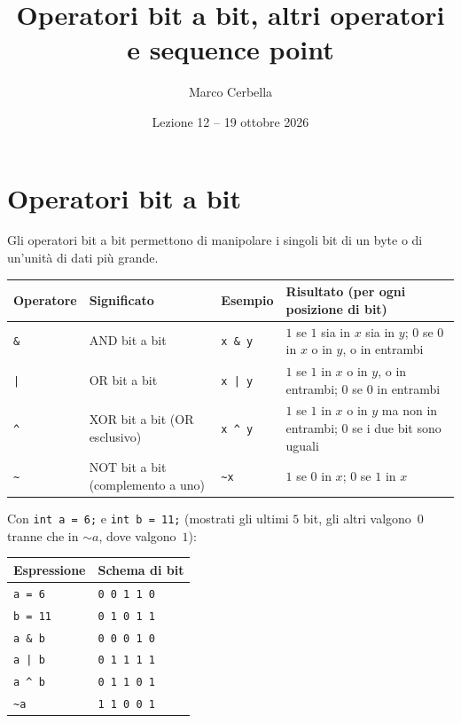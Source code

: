 \documentclass[11pt,a4paper]{article}
\title{Operatori bit a bit, altri operatori e sequence point}
\author{Marco Cerbella}
\date{Lezione 12 -- 19 ottobre 2026}
\begin{document}
\maketitle

\section{Operatori bit a bit}

Gli operatori bit a bit permettono di manipolare i singoli bit di un byte o di un'unità di dati più grande.

\begin{center}
\begin{tabular}{l p{3.2cm} l p{5.6cm}}
\toprule
Operatore & Significato & Esempio & Risultato (per ogni posizione di bit)\\
\midrule
\lstinline|&| & AND bit a bit & \lstinline|x & y| & $1$ se $1$ sia in $x$ sia in $y$; $0$ se $0$ in $x$ o in $y$, o in entrambi\\
\lstinline/|/ & OR bit a bit & \lstinline/x | y/ & $1$ se $1$ in $x$ o in $y$, o in entrambi; $0$ se $0$ in entrambi\\
\lstinline|^| & XOR bit a bit (OR esclusivo) & \lstinline|x ^ y| & $1$ se $1$ in $x$ o in $y$ ma non in entrambi; $0$ se i due bit sono uguali\\
\lstinline|~| & NOT bit a bit (complemento a uno) & \lstinline|~x| & $1$ se $0$ in $x$; $0$ se $1$ in $x$\\
\bottomrule
\end{tabular}
\end{center}

\begin{esempio}
Con \lstinline|int a = 6;| e \lstinline|int b = 11;| (mostrati gli ultimi $5$ bit, gli altri valgono~$0$ tranne che in $\sim a$, dove valgono~$1$):
\begin{center}
\begin{tabular}{ll}
\toprule
Espressione & Schema di bit\\
\midrule
\lstinline|a = 6|  & \texttt{0\,0\,1\,1\,0}\\
\lstinline|b = 11| & \texttt{0\,1\,0\,1\,1}\\
\lstinline|a & b|  & \texttt{0\,0\,0\,1\,0}\\
\lstinline/a | b/  & \texttt{0\,1\,1\,1\,1}\\
\lstinline|a ^ b|  & \texttt{0\,1\,1\,0\,1}\\
\lstinline|~a|     & \texttt{1\,1\,0\,0\,1}\\
\bottomrule
\end{tabular}
\end{center}
\end{esempio}
\end{document}
